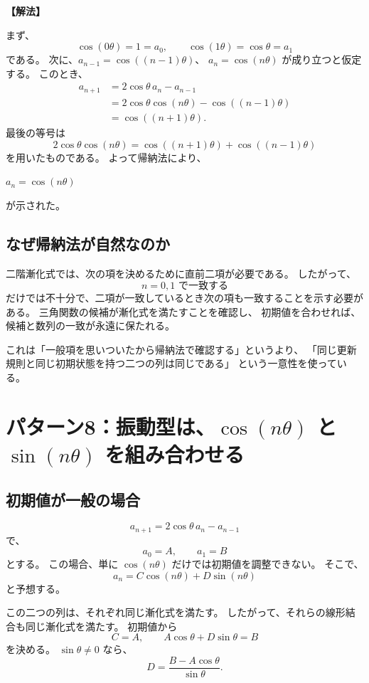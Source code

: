 \noindent\textbf{【解法】}

まず、
\[
  \cos(0\theta)=1=a_0,\qquad
  \cos(1\theta)=\cos\theta=a_1
\]
である。
次に、$a_{n-1}=\cos((n-1)\theta)$、
$a_n=\cos(n\theta)$ が成り立つと仮定する。
このとき、
\[
  \begin{aligned}
    a_{n+1}
     & =2\cos\theta\,a_n-a_{n-1} \\
     & =2\cos\theta\cos(n\theta)
    -\cos((n-1)\theta)           \\
     & =\cos((n+1)\theta).
  \end{aligned}
\]
最後の等号は
\[
  2\cos\theta\cos(n\theta)
  =\cos((n+1)\theta)+\cos((n-1)\theta)
\]
を用いたものである。
よって帰納法により、
\begin{mdquote}
  $a_n=\cos(n\theta)$
\end{mdquote}
が示された。

\subsection{なぜ帰納法が自然なのか}

二階漸化式では、次の項を決めるために直前二項が必要である。
したがって、
\[
  n=0,1\text{ で一致する}
\]
だけでは不十分で、二項が一致しているとき次の項も一致することを示す必要がある。
三角関数の候補が漸化式を満たすことを確認し、
初期値を合わせれば、候補と数列の一致が永遠に保たれる。

これは「一般項を思いついたから帰納法で確認する」というより、
「同じ更新規則と同じ初期状態を持つ二つの列は同じである」
という一意性を使っている。

\section{パターン8：振動型は、$\cos(n\theta)$ と $\sin(n\theta)$ を組み合わせる}

\subsection{初期値が一般の場合}

\[
  a_{n+1}=2\cos\theta\,a_n-a_{n-1}
\]
で、
\[
  a_0=A,\qquad a_1=B
\]
とする。
この場合、単に $\cos(n\theta)$ だけでは初期値を調整できない。
そこで、
\[
  a_n=C\cos(n\theta)+D\sin(n\theta)
\]
と予想する。

この二つの列は、それぞれ同じ漸化式を満たす。
したがって、それらの線形結合も同じ漸化式を満たす。
初期値から
\[
  C=A,\qquad
  A\cos\theta+D\sin\theta=B
\]
を決める。
$\sin\theta\neq0$ なら、
\[
  D=\frac{B-A\cos\theta}{\sin\theta}.
\]

